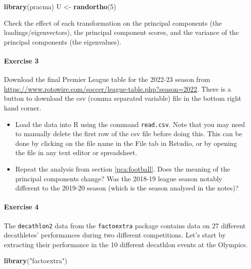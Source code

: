 \documentclass[
]{book}
\newenvironment{Shaded}{\begin{snugshade}}{\end{snugshade}}
\newcommand{\DecValTok}[1]{\textcolor[rgb]{0.00,0.00,0.81}{#1}}
\newcommand{\FunctionTok}[1]{\textcolor[rgb]{0.13,0.29,0.53}{\textbf{#1}}}
\newcommand{\NormalTok}[1]{#1}
\newcommand{\OtherTok}[1]{\textcolor[rgb]{0.56,0.35,0.01}{#1}}
\newcommand{\StringTok}[1]{\textcolor[rgb]{0.31,0.60,0.02}{#1}}
\theoremstyle{definition}
\theoremstyle{definition}
\theoremstyle{definition}
\theoremstyle{definition}
\theoremstyle{remark}
\begin{document}
\begin{Shaded}
\begin{Highlighting}[]
\FunctionTok{library}\NormalTok{(pracma)}
\NormalTok{U }\OtherTok{\textless{}{-}} \FunctionTok{randortho}\NormalTok{(}\DecValTok{5}\NormalTok{)}
\end{Highlighting}
\end{Shaded}

Check the effect of each transformation on the principal components (the loadings/eigenvectors), the principal component scores, and the variance of the principal components (the eigenvalues).

\paragraph*{Exercise 3}\label{exercise-3}

Download the final Premier League table for the 2022-23 season from
\url{https://www.rotowire.com/soccer/league-table.php?season=2022}. There is a button to download the csv (comma separated variable) file in the bottom right hand corner.

\begin{itemize}
\item
  Load the data into R using the command \texttt{read.csv}. Note that you may need to manually delete the first row of the csv file before doing this. This can be done by clicking on the file name in the File tab in Rstudio, or by opening the file in any text editor or spreadsheet.
\item
  Repeat the analysis from section \ref{pca:football}. Does the meaning of the principal components change? Was the 2018-19 league season notably different to the 2019-20 season (which is the season analysed in the notes)?
\end{itemize}

\paragraph*{Exercise 4}\label{exercise-4}

The \texttt{decathlon2} data from the \texttt{factoextra} package contains
data on 27 different decathletes' performances during two different competitions. Let's start by extracting their performance in the 10 different decathlon events at the Olympics.

\begin{Shaded}
\begin{Highlighting}[]
\FunctionTok{library}\NormalTok{(}\StringTok{"factoextra"}\NormalTok{)}
\end{Highlighting}
\end{Shaded}
\end{document}
